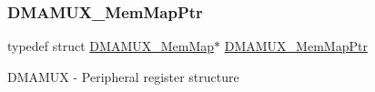 \subsubsection{\texorpdfstring{D\+M\+A\+M\+U\+X\+\_\+\+Mem\+Map\+Ptr}{DMAMUX\_MemMapPtr}}
{\footnotesize\ttfamily typedef struct \hyperlink{struct_d_m_a_m_u_x___mem_map}{D\+M\+A\+M\+U\+X\+\_\+\+Mem\+Map}$\ast$ \hyperlink{group___d_m_a_m_u_x___peripheral_ga736ab5b1ed284b3b4fdb63010a576777}{D\+M\+A\+M\+U\+X\+\_\+\+Mem\+Map\+Ptr}}

D\+M\+A\+M\+UX -\/ Peripheral register structure 